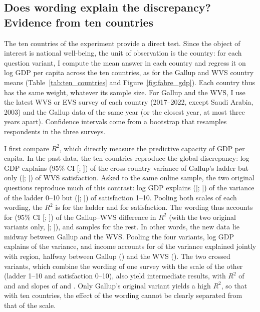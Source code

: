 \documentclass[12pt]{article}
\begin{document}
\subsection{Does wording explain the discrepancy? Evidence from ten countries}\label{subsec:ten_countries}

The ten countries of the experiment provide a direct test. Since the object of interest is national well-being, the unit of observation is the country: for each question variant, I compute the mean answer in each country and regress it on log GDP per capita across the ten countries, as for the Gallup and WVS country means (Table~\ref{tab:ten_countries} and Figure~\ref{fig:fabre_gdp}). Each country thus has the same weight, whatever its sample size. For Gallup and the WVS, I use the latest WVS or EVS survey of each country (2017--2022, except Saudi Arabia, 2003) and the Gallup data of the same year (or the closest year, at most three years apart). Confidence intervals come from a bootstrap that resamples respondents in the three surveys.

I first compare $R^2$, which directly measure the predictive capacity of GDP per capita. In the past data, the ten countries reproduce the global discrepancy: log GDP explains \RtwoTenGallup (95\% CI [\decompLowRGallup; \decompHighRGallup]) of the cross-country variance of Gallup's ladder but only \RtwoTenWVS ([\decompLowRWvs; \decompHighRWvs]) of WVS satisfaction. Asked to the same online sample, the two original questions reproduce much of this contrast: log GDP explains \RtwoTenFabreLadder ([\decompLowRFabreLadder; \decompHighRFabreLadder]) of the variance of the ladder 0--10 but \RtwoTenFabreSatisfaction ([\decompLowRFabreSatisfaction; \decompHighRFabreSatisfaction]) of satisfaction 1--10. Pooling both scales of each wording, the $R^2$ is \RtwoTenFabreLadderPooled for the ladder and \RtwoTenFabreSatisfactionPooled for satisfaction. The wording thus accounts for \decompShareRWordingPooled (95\% CI [\decompLowShareRWordingPooled; \decompHighShareRWordingPooled]) of the Gallup--WVS difference in $R^2$ (\decompShareRWording with the two original variants only, [\decompLowShareRWording; \decompHighShareRWording]), and samples for the rest. In other words, the new data lie midway between Gallup and the WVS. Pooling the four variants, log GDP explains \RtwoTenFabreAll of the variance, and income accounts for \shareIncomeTenFabreAll of the variance explained jointly with region, halfway between Gallup (\shareIncomeTenGallup) and the WVS (\shareIncomeTenWVS). The two crossed variants, which combine the wording of one survey with the scale of the other (ladder 1--10 and satisfaction 0--10), also yield intermediate results, with $R^2$ of \RtwoTenFabreLadderOneTen and \RtwoTenFabreSatisfactionZeroTen and slopes of \slopeTenFabreLadderOneTen and \slopeTenFabreSatisfactionZeroTen. Only Gallup's original variant yields a high $R^2$, so that with ten countries, the effect of the wording cannot be clearly separated from that of the scale.
\end{document}
